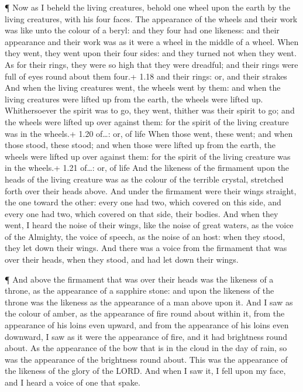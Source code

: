  ¶ Now as I beheld the living creatures, behold one wheel
upon the earth by the living creatures, with his four faces.
 The appearance of the wheels and their work was like unto
the colour of a beryl: and they four had one likeness: and their
appearance and their work was as it were a wheel in the middle of a
wheel.  When they went, they went upon their four sides:
and they turned not when they went.  As for their rings,
they were so high that they were dreadful; and their rings were full of
eyes round about them four.+ 1.18 and their rings: or, and their strakes
 And when the living creatures went, the wheels went by
them: and when the living creatures were lifted up from the earth, the
wheels were lifted up.  Whithersoever the spirit was to go,
they went, thither was their spirit to go; and the wheels were lifted up
over against them: for the spirit of the living creature was in the
wheels.+ 1.20 of\ldots: or, of life  When those went, these
went; and when those stood, these stood; and when those were lifted up
from the earth, the wheels were lifted up over against them: for the
spirit of the living creature was in the wheels.+ 1.21 of\ldots: or, of
life  And the likeness of the firmament upon the heads of
the living creature was as the colour of the terrible crystal, stretched
forth over their heads above.  And under the firmament were
their wings straight, the one toward the other: every one had two, which
covered on this side, and every one had two, which covered on that side,
their bodies.  And when they went, I heard the noise of
their wings, like the noise of great waters, as the voice of the
Almighty, the voice of speech, as the noise of an host: when they stood,
they let down their wings.  And there was a voice from the
firmament that was over their heads, when they stood, and had let down
their wings.

 ¶ And above the firmament that was over their heads was
the likeness of a throne, as the appearance of a sapphire stone: and
upon the likeness of the throne was the likeness as the appearance of a
man above upon it.  And I saw as the colour of amber, as
the appearance of fire round about within it, from the appearance of his
loins even upward, and from the appearance of his loins even downward, I
saw as it were the appearance of fire, and it had brightness round
about.  As the appearance of the bow that is in the cloud
in the day of rain, so was the appearance of the brightness round about.
This was the appearance of the likeness of the glory of the LORD. And
when I saw it, I fell upon my face, and I heard a voice of one that
spake.

